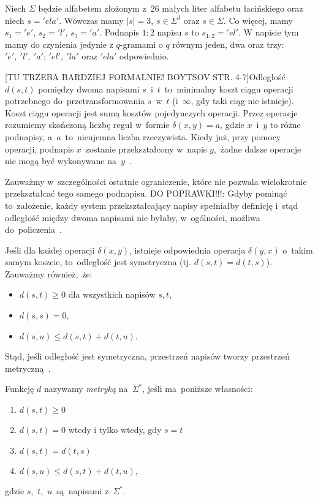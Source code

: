 \documentclass{praca1}
\begin{document}
\begin{example}
Niech $\Sigma$ będzie alfabetem złożonym z~$26$ małych liter alfabetu łacińskiego oraz niech $s = 'ela'$. Wówczas mamy $|s| = 3$, $s \in \Sigma^3$ oraz $s \in \Sigma$. Co więcej, mamy $s_1 = 'e'$, $s_2 = 'l'$, $s_3 = 'a'$. Podnapis $1:2$ napisu $s$ to $s_{1:2} = 'el'$. W napisie tym mamy do czynienia jedynie z $q$-gramami o $q$ równym jeden, dwa oraz trzy: $'e',\ 'l',\ 'a'$; $'el',\ 'la'$ oraz $'ela'$ odpowiednio.
\end{example}


[TU TRZEBA BARDZIEJ FORMALNIE! BOYTSOV STR. 4-7]Odległość $d(s,t)$ pomiędzy dwoma napisami $s$~i~$t$~to~minimalny koszt ciągu operacji potrzebnego do~przetransformowania $s$~w~$t$ (i~$\infty$, gdy taki ciąg nie istnieje). Koszt ciągu operacji jest sumą kosztów pojedynczych operacji. Przez operacje rozumiemy skończoną liczbę reguł w~formie $\delta(x, y) = a$, gdzie $x$~i~$y$ to różne podnapisy, a~$a$~to~nieujemna liczba rzeczywista. Kiedy już, przy pomocy operacji, podnapis $x$~zostanie przekształcony w~napis $y$,~żadne dalsze operacje nie mogą być wykonywane na~$y$~\cite{Navarro2001:guidedtour}.

Zauważmy w~szczególności ostatnie ograniczenie, które nie pozwala wielokrotnie przekształcać tego samego podnapisu. DO POPRAWKI!!!: Gdyby pominąć to~założenie, każdy system przekształcający napisy spełniałby definicję i~stąd odległość między dwoma napisami nie byłaby, w~ogólności, możliwa do~policzenia~\cite{Navarro2001:guidedtour}.

Jeśli dla każdej operacji $\delta(x,y)$, istnieje odpowiednia operacja $\delta(y,x)$ o~takim samym koszcie, to~odległość jest symetryczna (tj. $d(s,t) = d(t,s)$). Zauważmy również,~że:
\begin{itemize}
\item $d(s,t) \geq 0$ dla wszystkich napisów $s, t$,
\item $d(s,s) = 0$,
\item $d(s,u) \leq d(s,t) + d(t,u)$.
\end{itemize}
Stąd, jeśli odległość jest symetryczna, przestrzeń napisów tworzy przestrzeń metryczną~\cite{Navarro2001:guidedtour}.

\begin{definition}
\label{def:001}
Funkcję $d$ nazywamy \emph{metryką} na~$\Sigma^*$, jeśli ma~poniższe własności:
\begin{enumerate}
\item \label{def:001a} $d(s,t) \geq 0$
\item \label{def:001b} $d(s,t) = 0$ wtedy i tylko wtedy, gdy $s = t$
\item \label{def:001c} $d(s,t) = d(t,s)$
\item \label{def:001d} $d(s,u) \leq d(s,t) + d(t,u)$,
\end{enumerate}
gdzie $s$,~$t$,~$u$~są~napisami z~$\Sigma^*$.


\end{definition}
\end{document}
